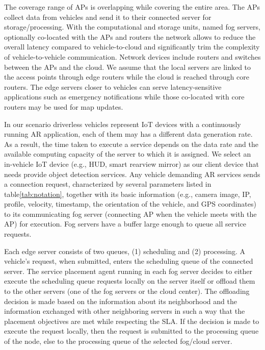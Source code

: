 \documentclass[twocolumn]{article}
\begin{document}
\par The coverage range of APs is overlapping while covering the entire area. The APs collect data from vehicles and send it to their connected server for storage/processing. With the computational and storage units, named fog servers, optionally co-located with the APs and routers the network allows to reduce the overall latency compared to vehicle-to-cloud and significantly trim the complexity of vehicle-to-vehicle communication. 
Network devices include routers and switches between the APs and the cloud. We assume that the local servers are linked to the access points through edge routers while the cloud is reached through core routers. The edge servers closer to vehicles can serve latency-sensitive applications such as emergency notifications while those co-located with core routers may be used for map updates.

\par In our scenario driverless vehicles represent IoT devices with a continuously running AR application, each of them may has a different data generation rate. As a result, the time taken to execute a service depends on the data rate and the available computing capacity of the server to which it is assigned. We select an in-vehicle IoT device (e.g., HUD, smart rearview mirror) as our client device that needs provide object detection services. Any vehicle demanding AR services sends a connection request, characterized by several parameters listed in table\ref{tab:notation}, together with its basic information (e.g., camera image, IP, profile, velocity, timestamp, the orientation of the vehicle, and GPS coordinates) to its communicating fog server (connecting AP when the vehicle meets with the AP) for execution. Fog servers have a buffer large enough to queue all service requests.

\par Each edge server consists of two queues, (1) scheduling and (2) processing. A vehicle’s request, when submitted, enters the scheduling queue of the connected server. The service placement agent running in each fog server decides to either execute the scheduling queue requests locally on the server itself or offload them to the other servers (one of the fog servers or the cloud center). The offloading decision is made based on the information about its neighborhood and the information exchanged with other neighboring servers in such a way that the placement objectives are met while respecting the SLA. If the decision is made to execute the request locally, then the request is submitted to the processing queue of the node, else to the processing queue of the selected fog/cloud server. 
\end{document}
